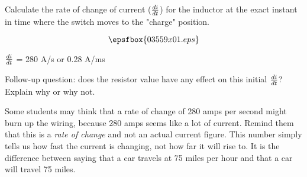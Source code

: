 

Calculate the rate of change of current ($di \over dt$) for the inductor at the exact instant in time where the switch moves to the "charge" position.

$$\epsfbox{03559x01.eps}$$







$di \over dt$ = 280 A/s or 0.28 A/ms

\vskip 10pt

Follow-up question: does the resistor value have any effect on this initial $di \over dt$?  Explain why or why not.







Some students may think that a rate of change of 280 amps per second might burn up the wiring, because 280 amps seems like a lot of current.  Remind them that this is a {\it rate of change} and not an actual current figure.  This number simply tells us how fast the current is changing, not how far it will rise to.  It is the difference between saying that a car travels at 75 miles per hour and that a car will travel 75 miles.




